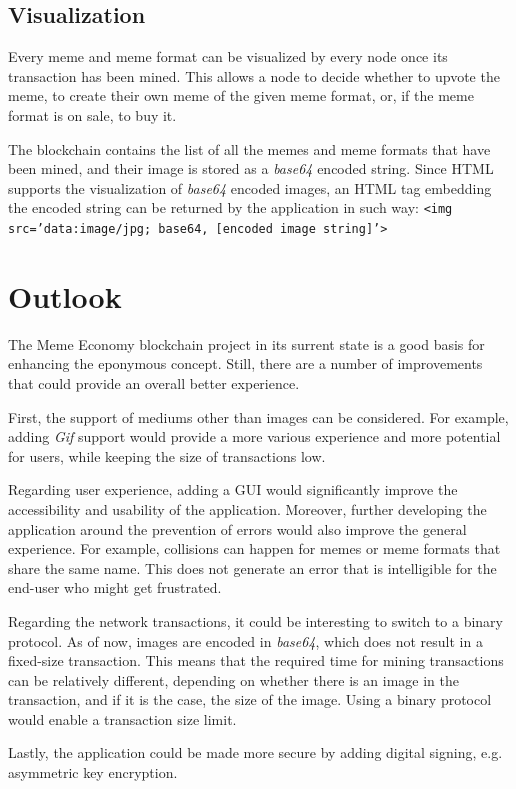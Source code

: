 \documentclass[12pt]{article}
\begin{document}
\subsection{Visualization} %
Every meme and meme format can be visualized by every node once its transaction has been mined. This allows a node to decide whether to upvote the meme, to create their own meme of the given meme format, or, if the meme format is on sale, to buy it.

The blockchain contains the list of all the memes and meme formats that have been mined, and their image is stored as a \textit{base64} encoded string. Since HTML supports the visualization of \textit{base64} encoded images, an HTML tag embedding the encoded string can be returned by the application in such way: {\tt <img src='data:image/jpg; base64, [encoded image string]'>}

\section{Outlook} \label{sec:Outlook} %
The Meme Economy blockchain project in its surrent state is a good basis for enhancing the eponymous concept. Still, there are a number of improvements that could provide an overall better experience.

First, the support of mediums other than images can be considered. For example, adding \textit{Gif} support would provide a more various experience and more potential for users, while keeping the size of transactions low.

Regarding user experience, adding a \ac{GUI} would significantly improve the accessibility and usability of the application. Moreover, further developing the application around the prevention of errors would also improve the general experience. For example, collisions can happen for memes or meme formats that share the same name. This does not generate an error that is intelligible for the end-user who might get frustrated.

Regarding the network transactions, it could be interesting to switch to a binary protocol. As of now, images are encoded in \textit{base64}, which does not result in a fixed-size transaction. This means that the required time for mining transactions can be relatively different, depending on whether there is an image in the transaction, and if it is the case, the size of the image. Using a binary protocol would enable a transaction size limit.

Lastly, the application could be made more secure by adding digital signing, e.g. asymmetric key encryption.
\end{document}
